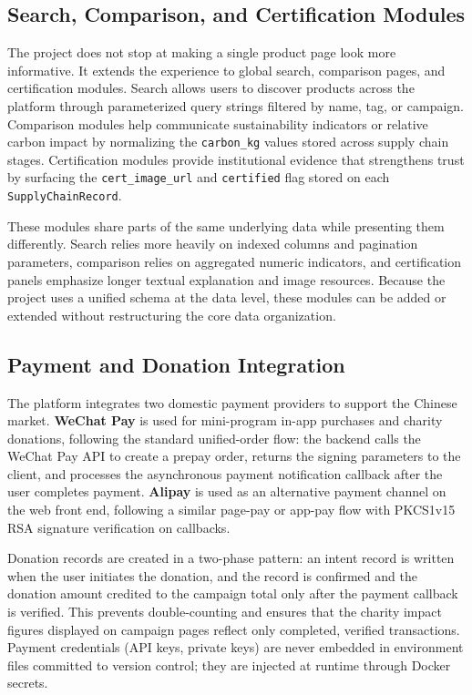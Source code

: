 \documentclass[11pt]{article}
\begin{document}
\subsection{Search, Comparison, and Certification Modules}
The project does not stop at making a single product page look more informative. It extends the experience to global search, comparison pages, and certification modules. Search allows users to discover products across the platform through parameterized query strings filtered by name, tag, or campaign. Comparison modules help communicate sustainability indicators or relative carbon impact by normalizing the \texttt{carbon\_kg} values stored across supply chain stages. Certification modules provide institutional evidence that strengthens trust by surfacing the \texttt{cert\_image\_url} and \texttt{certified} flag stored on each \texttt{SupplyChainRecord}.

These modules share parts of the same underlying data while presenting them differently. Search relies more heavily on indexed columns and pagination parameters, comparison relies on aggregated numeric indicators, and certification panels emphasize longer textual explanation and image resources. Because the project uses a unified schema at the data level, these modules can be added or extended without restructuring the core data organization.

\subsection{Payment and Donation Integration}
The platform integrates two domestic payment providers to support the Chinese market. \textbf{WeChat Pay} is used for mini-program in-app purchases and charity donations, following the standard unified-order flow: the backend calls the WeChat Pay API to create a prepay order, returns the signing parameters to the client, and processes the asynchronous payment notification callback after the user completes payment. \textbf{Alipay} is used as an alternative payment channel on the web front end, following a similar page-pay or app-pay flow with PKCS1v15 RSA signature verification on callbacks.

Donation records are created in a two-phase pattern: an intent record is written when the user initiates the donation, and the record is confirmed and the donation amount credited to the campaign total only after the payment callback is verified. This prevents double-counting and ensures that the charity impact figures displayed on campaign pages reflect only completed, verified transactions. Payment credentials (API keys, private keys) are never embedded in environment files committed to version control; they are injected at runtime through Docker secrets.
\end{document}
